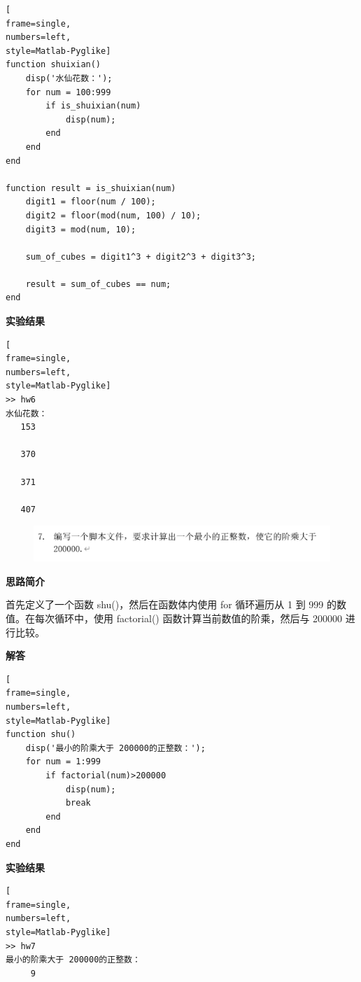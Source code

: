 \documentclass[12pt,UTF8]{ctexart}
\begin{document}
\begin{lstlisting}[
frame=single,
numbers=left,
style=Matlab-Pyglike]
function shuixian()
    disp('水仙花数：');
    for num = 100:999
        if is_shuixian(num)
            disp(num);
        end
    end
end

function result = is_shuixian(num)
    digit1 = floor(num / 100);
    digit2 = floor(mod(num, 100) / 10);
    digit3 = mod(num, 10);
    
    sum_of_cubes = digit1^3 + digit2^3 + digit3^3;
    
    result = sum_of_cubes == num;
end

\end{lstlisting}


\par \textbf{实验结果}

\begin{lstlisting}[
frame=single,
numbers=left,
style=Matlab-Pyglike]
>> hw6
水仙花数：
   153

   370

   371

   407
\end{lstlisting}
\clearpage





\begin{figure}
    \centering
    \includegraphics[width=1\linewidth]{++7.png}
    
    
\end{figure}
\par \textbf{思路简介}
\par 首先定义了一个函数 shu()，然后在函数体内使用 for 循环遍历从 1 到 999 的数值。在每次循环中，使用 factorial() 函数计算当前数值的阶乘，然后与 200000 进行比较。
\par \textbf{解答}

\begin{lstlisting}[
frame=single,
numbers=left,
style=Matlab-Pyglike]
function shu()
    disp('最小的阶乘大于 200000的正整数：');
    for num = 1:999
        if factorial(num)>200000
            disp(num);
            break
        end
    end
end

\end{lstlisting}


\par \textbf{实验结果}
\begin{lstlisting}[
frame=single,
numbers=left,
style=Matlab-Pyglike]
>> hw7
最小的阶乘大于 200000的正整数：
     9
\end{lstlisting}
\end{document}
